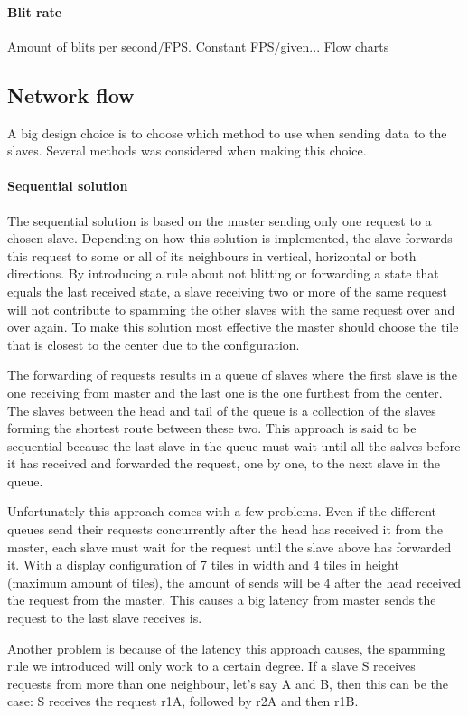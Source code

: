 \documentclass[12pt, a4paper, oneside]{article}
\begin{document}
\paragraph{Blit rate}
Amount of blits per second/FPS. Constant FPS/given...
Flow charts

\subsection{Network flow}
A big design choice is to choose which method to use when sending data to the slaves. Several methods was considered when making this choice. 

\paragraph{Sequential solution}
The sequential solution is based on the master sending only one request to a chosen slave. Depending on how this solution is implemented, the slave forwards this request to some or all of its neighbours in vertical, horizontal or both directions. By introducing a rule about not blitting or forwarding a state that equals the last received state, a slave receiving two or more of the same request will not contribute to spamming the other slaves with the same request over and over again. To make this solution most effective the master should choose the tile that is closest to the center due to the configuration.

The forwarding of requests results in a queue of slaves where the first slave is the one receiving from master and the last one is the one furthest from the center. The slaves between the head and tail of the queue is a collection of the slaves forming the shortest route between these two. 
This approach is said to be sequential because the last slave in the queue must wait until all the salves before it has received and forwarded the request, one by one, to the next slave in the queue.

Unfortunately this approach comes with a few problems. Even if the different queues send their requests concurrently after the head has received it from the master, each slave must wait for the request until the slave above has forwarded it. With a display configuration of 7 tiles in width and 4 tiles in height (maximum amount of tiles), the amount of sends will be 4 after the head received the request from the master. This causes a big latency from master sends the request to the last slave receives is. 

Another problem is because of the latency this approach causes, the spamming rule we introduced will only work to a certain degree. If a slave S receives requests from more than one neighbour, let's say A and B, then this can be the case:
S receives the request r1A, followed by r2A and then r1B.
\end{document}
